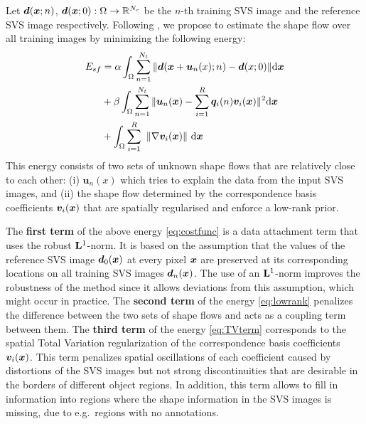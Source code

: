 Let $\bm{d}(\boldsymbol{x};n)$, $\bm{d}(\boldsymbol{x};0):\Omega\rightarrow \mathbb{R}^{N_c}$ be the $n$-th training SVS image and the reference SVS image respectively. Following \cite{Garg:2013hu}, we propose to estimate the shape flow over all training images by minimizing the following energy:
\begin{align}
E_{sf} & =\alpha
\int_{\Omega}\sum_{n=1}^{N_t} \|\bm{d}(\boldsymbol{x}+\bm{u}_n(x);n)-\bm{d}(x;0)\| \mathrm{d} \boldsymbol{x} \label{eq:costfunc}\\
    &+ \beta \int_{\Omega}\sum_{n=1}^{N_t}\|\bm{u}_n(\boldsymbol{x})-\sum_{i=1}^R\bm{q}_i(n)\bm{v}_i(\boldsymbol{x})\|^2 \mathrm{d} \boldsymbol{x} \label{eq:lowrank}\\
    &+
\int_\Omega  \sum_{i=1}^R \,\, \left \|    \nabla \bm{v}_i(\boldsymbol{x})    \right \|  \,\mathrm{d} \boldsymbol{x} \label{eq:TVterm}
\end{align}
This energy consists of two sets of unknown shape flows that are relatively close to each other: (i) $\bm{u}_n(x)$ which tries to explain the data from the input SVS images, and (ii) the shape flow determined by the correspondence basis coefficients $\bm{v}_i(\boldsymbol{x})$ that are spatially regularised and enforce a low-rank prior. 

The \textbf{first term} of the above energy \eqref{eq:costfunc} is a data attachment term
that uses the robust $\mathbf{L}^1$-norm.  It is based on the assumption that the values of the reference SVS image $\bm{d}_0(\boldsymbol{x})$ at every pixel $\boldsymbol{x}$ are preserved at its corresponding locations on all training SVS images $\bm{d}_n(\boldsymbol{x})$. The use of an $\mathbf{L}^1$-norm improves the robustness of the method since it allows deviations from this assumption, which might occur in practice.
The \textbf{second term} of the energy \eqref{eq:lowrank} penalizes the difference between the two sets  of shape flows and acts as a coupling term between them.
The \textbf{third term} of the energy \eqref{eq:TVterm} corresponds to the spatial Total Variation regularization \cite{rudin92} of
the correspondence basis coefficients $\bm{v}_i(\boldsymbol{x})$.
This term penalizes spatial oscillations of each coefficient caused by distortions of the SVS images but not strong discontinuities that are desirable in the borders of different object regions. In addition, this term allows to fill in information into regions where the shape information in the SVS images is missing, due to e.g.~regions with no annotations.

